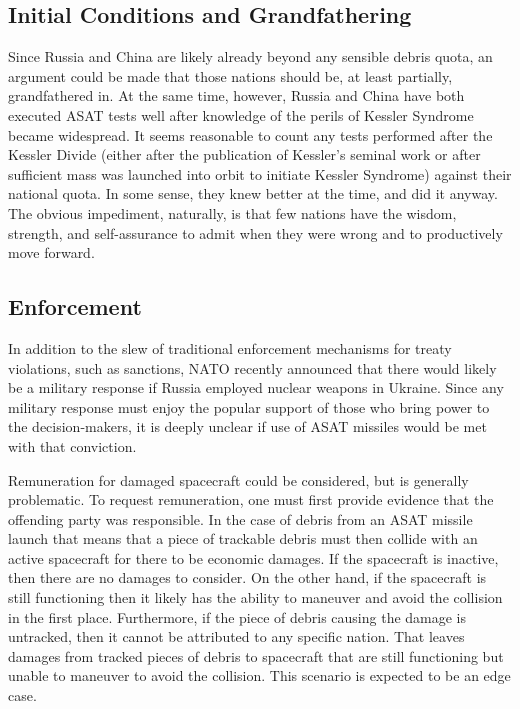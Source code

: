 \subsection{Initial Conditions and Grandfathering}
Since Russia and China are likely already beyond any sensible debris
quota, an argument could be made that those nations should be, at
least partially, grandfathered in.  At the same time, however, Russia
and China have both executed ASAT tests well after knowledge of the
perils of Kessler Syndrome became widespread.  It seems reasonable to
count any tests performed after the Kessler Divide (either after the
publication of Kessler's seminal work or after sufficient mass was
launched into orbit to initiate Kessler Syndrome) against their
national quota.  In some sense, they knew better at the time, and did
it anyway.  The obvious impediment, naturally, is that few nations
have the wisdom, strength, and self-assurance to admit when they were
wrong and to productively move forward.

\subsection{Enforcement}
In addition to the slew of traditional enforcement mechanisms for
treaty violations, such as sanctions, NATO recently announced that
there would likely be a military response if Russia employed nuclear
weapons in Ukraine.  Since any military response must enjoy the
popular support of those who bring power to the decision-makers, it is
deeply unclear if use of ASAT missiles would be met with that
conviction.

Remuneration for damaged spacecraft could be considered, but is
generally problematic.  To request remuneration, one must first
provide evidence that the offending party was responsible.  In the
case of debris from an ASAT missile launch that means that a piece of
trackable debris must then collide with an active spacecraft for there
to be economic damages.  If the spacecraft is inactive, then there are
no damages to consider.  On the other hand, if the spacecraft is still
functioning then it likely has the ability to maneuver and avoid the
collision in the first place.  Furthermore, if the piece of debris
causing the damage is untracked, then it cannot be attributed to any
specific nation.  That leaves damages from tracked pieces of debris to
spacecraft that are still functioning but unable to maneuver to avoid
the collision.  This scenario is expected to be an edge case.


